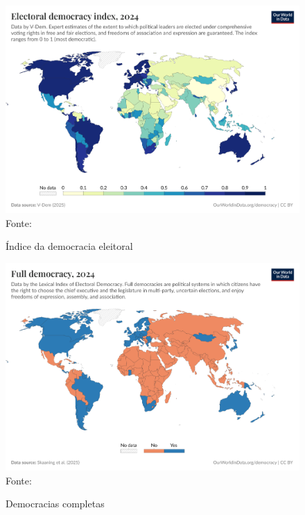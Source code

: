 \begin{figure}[ht]
    \centering
    \caption{Índice da democracia eleitoral}
    \includegraphics[width=1\linewidth]{figuras/democracia/electoral-democracy-index.png}
    \label{fig:electoral-democracy-index}
    \footnotesize{Fonte: \cite{electoral_democracy_index}}
\end{figure}

\begin{figure}[ht]
    \centering
    \caption{Democracias completas}
    \includegraphics[width=1\linewidth]{figuras/democracia/full-democracy-lexical.png}
    \label{fig:full-democracy-lexical}
    \footnotesize{Fonte: \cite{full_democracy_lexical}}
\end{figure}

